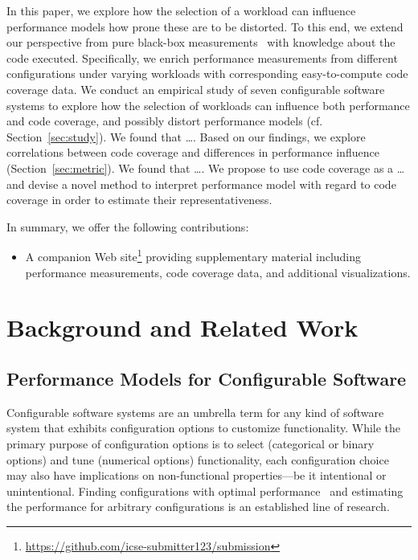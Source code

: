 In this paper, we explore how the selection of a workload can influence performance models how prone these are to be distorted. To this end, we extend our perspective from pure black-box measurements~\cite{dorn2020,siegmundPerformanceinfluenceModelsHighly2015,haDeepPerf2019,perfAL,guoVariabilityawarePerformancePrediction2013,sarkarCostEfficientSamplingPerformance,guo_2018_data,fourier_learning_2015,perLasso} with knowledge about the code executed. Specifically, we enrich performance measurements from different configurations under varying workloads with corresponding easy-to-compute code coverage data. 
We conduct an empirical study of seven configurable software systems to explore how the selection of workloads can influence both performance and code coverage, and possibly distort performance models (cf. Section~\ref{sec:study}). {\color{teal}We found that \ldots.} 
Based on our findings, we explore correlations between code coverage and differences in performance influence (Section~\ref{sec:metric}). {\color{teal}	We found that \ldots. We propose to use code coverage as a \ldots and devise a novel method to interpret performance model with regard to code coverage in order to estimate their representativeness.}

In summary, we offer the following contributions:
\begin{itemize}
	\item A companion Web site\footnote{\url{https://github.com/icse-submitter123/submission}} providing supplementary material including performance measurements, code coverage data, and additional visualizations.
\end{itemize}
\section{Background and Related Work}
\subsection{Performance Models for Configurable Software}
Configurable software systems are an umbrella term for any kind of software system that exhibits configuration options to customize functionality. 
While the primary purpose of configuration options is to select (categorical or binary options) and tune (numerical options) functionality, each configuration choice may also have implications on non-functional properties---be it intentional or unintentional. Finding configurations with optimal performance~\cite{nairUsingBadLearners2017,nairFlash18,ohFindingNearoptimalConfigurations2017} and estimating the performance for arbitrary configurations is an established line of research\cite{siegmundPerformanceinfluenceModelsHighly2015,haDeepPerf2019,perfAL,guoVariabilityawarePerformancePrediction2013,sarkarCostEfficientSamplingPerformance,guo_2018_data,fourier_learning_2015,perLasso}. 


